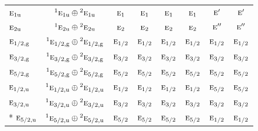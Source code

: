 \documentclass[10pt,a4paper]{article}
\numberwithin{equation}{section}
\newcommand{\irr}[1]{\text{\normalfont\scshape #1}}
\newcommand{\conjpair}[1]{{}^{#1}}
\newcommand{\ptag}[1]{\mathrm{#1}}
\begin{document}
{\begin{longtable}{@{}lccccccc@{}}
$\irr{e}_{1\ptag{u}}$ & $\conjpair{1}\irr{e}_{1\ptag{u}}\oplus \conjpair{2}\irr{e}_{1\ptag{u}}$ & $\irr{e}_{1}$ & $\irr{e}_{1}$ & $\irr{e}_{1}$ & $\irr{e}_{1}$ & $\irr{e}'$ & $\irr{e}'$\\
$\irr{e}_{2\ptag{u}}$ & $\conjpair{1}\irr{e}_{2\ptag{u}}\oplus \conjpair{2}\irr{e}_{2\ptag{u}}$ & $\irr{e}_{2}$ & $\irr{e}_{2}$ & $\irr{e}_{2}$ & $\irr{e}_{2}$ & $\irr{e}''$ & $\irr{e}''$\\
$\irr{e}_{1/2,\ptag{g}}$ & $\conjpair{1}\irr{e}_{1/2,\ptag{g}}\oplus \conjpair{2}\irr{e}_{1/2,\ptag{g}}$ & $\irr{e}_{1/2}$ & $\irr{e}_{1/2}$ & $\irr{e}_{1/2}$ & $\irr{e}_{1/2}$ & $\irr{e}_{1/2}$ & $\irr{e}_{1/2}$\\
$\irr{e}_{3/2,\ptag{g}}$ & $\conjpair{1}\irr{e}_{3/2,\ptag{g}}\oplus \conjpair{2}\irr{e}_{3/2,\ptag{g}}$ & $\irr{e}_{3/2}$ & $\irr{e}_{3/2}$ & $\irr{e}_{3/2}$ & $\irr{e}_{3/2}$ & $\irr{e}_{3/2}$ & $\irr{e}_{3/2}$\\
$\irr{e}_{5/2,\ptag{g}}$ & $\conjpair{1}\irr{e}_{5/2,\ptag{g}}\oplus \conjpair{2}\irr{e}_{5/2,\ptag{g}}$ & $\irr{e}_{5/2}$ & $\irr{e}_{5/2}$ & $\irr{e}_{5/2}$ & $\irr{e}_{5/2}$ & $\irr{e}_{5/2}$ & $\irr{e}_{5/2}$\\
$\irr{e}_{1/2,\ptag{u}}$ & $\conjpair{1}\irr{e}_{1/2,\ptag{u}}\oplus \conjpair{2}\irr{e}_{1/2,\ptag{u}}$ & $\irr{e}_{1/2}$ & $\irr{e}_{1/2}$ & $\irr{e}_{1/2}$ & $\irr{e}_{1/2}$ & $\irr{e}_{5/2}$ & $\irr{e}_{5/2}$\\
$\irr{e}_{3/2,\ptag{u}}$ & $\conjpair{1}\irr{e}_{3/2,\ptag{u}}\oplus \conjpair{2}\irr{e}_{3/2,\ptag{u}}$ & $\irr{e}_{3/2}$ & $\irr{e}_{3/2}$ & $\irr{e}_{3/2}$ & $\irr{e}_{3/2}$ & $\irr{e}_{3/2}$ & $\irr{e}_{3/2}$\\*
$\irr{e}_{5/2,\ptag{u}}$ & $\conjpair{1}\irr{e}_{5/2,\ptag{u}}\oplus \conjpair{2}\irr{e}_{5/2,\ptag{u}}$ & $\irr{e}_{5/2}$ & $\irr{e}_{5/2}$ & $\irr{e}_{5/2}$ & $\irr{e}_{5/2}$ & $\irr{e}_{1/2}$ & $\irr{e}_{1/2}$\\
\bottomrule\end{longtable}}
\end{document}
